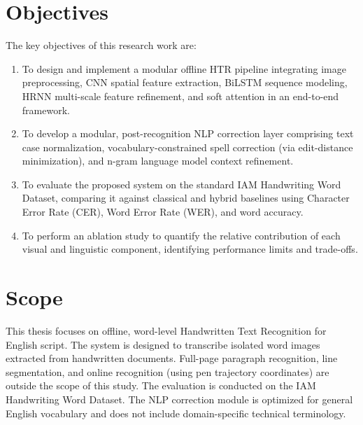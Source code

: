 \section{Objectives}
The key objectives of this research work are:
\begin{enumerate}
    \item To design and implement a modular offline HTR pipeline integrating image preprocessing, CNN spatial feature extraction, BiLSTM sequence modeling, HRNN multi-scale feature refinement, and soft attention in an end-to-end framework.
    \item To develop a modular, post-recognition NLP correction layer comprising text case normalization, vocabulary-constrained spell correction (via edit-distance minimization), and n-gram language model context refinement.
    \item To evaluate the proposed system on the standard IAM Handwriting Word Dataset, comparing it against classical and hybrid baselines using Character Error Rate (CER), Word Error Rate (WER), and word accuracy.
    \item To perform an ablation study to quantify the relative contribution of each visual and linguistic component, identifying performance limits and trade-offs.
\end{enumerate}

\section{Scope}
This thesis focuses on offline, word-level Handwritten Text Recognition for English script. The system is designed to transcribe isolated word images extracted from handwritten documents. Full-page paragraph recognition, line segmentation, and online recognition (using pen trajectory coordinates) are outside the scope of this study. The evaluation is conducted on the IAM Handwriting Word Dataset. The NLP correction module is optimized for general English vocabulary and does not include domain-specific technical terminology.

